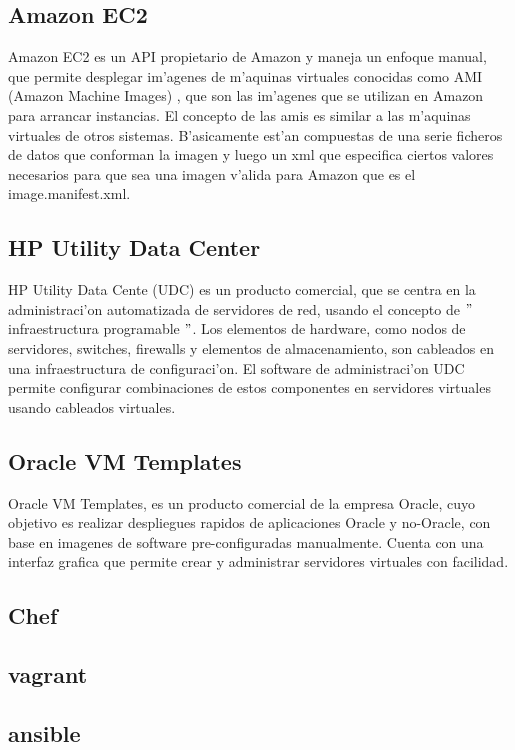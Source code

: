 \subsection{Amazon EC2}
Amazon EC2 es un API propietario de Amazon y maneja un enfoque manual, que permite desplegar im'agenes de m'aquinas virtuales conocidas como AMI (Amazon Machine Images) \cite{9}, que son las im'agenes que se utilizan en Amazon para arrancar instancias. El concepto de las amis es similar a las m'aquinas virtuales de otros sistemas. B'asicamente est'an compuestas de una serie ficheros de datos que conforman la imagen y luego un xml que especifica ciertos valores necesarios para que sea una imagen v'alida para Amazon que es el image.manifest.xml. 

\subsection{HP Utility Data Center}
HP Utility Data Cente (UDC) es un producto comercial, que se centra en la administraci'on automatizada de servidores de red, usando el concepto de $"$infraestructura programable $"$. Los elementos de hardware, como nodos de servidores, switches, firewalls y elementos de almacenamiento, son cableados en una infraestructura de configuraci'on. El software de administraci'on UDC permite configurar combinaciones de estos componentes en servidores virtuales usando cableados virtuales. \cite{15}

\subsection{Oracle VM Templates}
Oracle VM Templates, es un producto comercial de la empresa Oracle, cuyo objetivo es realizar despliegues rapidos de aplicaciones Oracle y no-Oracle, con base en imagenes de software pre-configuradas manualmente. Cuenta con una interfaz grafica que permite crear y administrar servidores virtuales con facilidad. \cite{14}

\subsection{Chef}
\subsection{vagrant}
\subsection{ansible}


